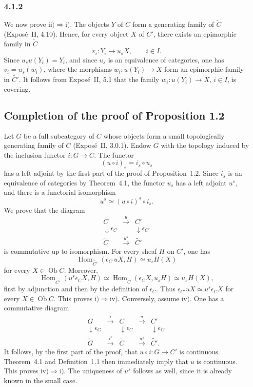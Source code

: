\documentclass[11pt]{article}
\newcommand{\Hom}{\operatorname{Hom}}
\newcommand{\Ob}{\operatorname{Ob}}
\begin{document}
\subsubsection*{4.1.2}
We now prove \(\mathrm{ii})\Rightarrow\mathrm{i})\). The objects \(Y\) of \(C\) form a generating family of \(\widetilde C\) (Expos\'e~II, 4.10). Hence, for every object \(X\) of \(C'\), there exists an epimorphic family in \(\widetilde C\)
\[
v_i:Y_i\longrightarrow u_sX,
\qquad i\in I.
\]
Since \(u_su(Y_i)=Y_i\), and since \(u_s\) is an equivalence of categories, one has \(v_i=u_s(w_i)\), where the morphisms \(w_i:u(Y_i)\to X\) form an epimorphic family in \(\widetilde{C'}\). It follows from Expos\'e~II, 5.1 that the family \(w_i:u(Y_i)\to X\), \(i\in I\), is covering.

\subsection{Completion of the proof of Proposition 1.2}
Let \(G\) be a full subcategory of \(C\) whose objects form a small topologically generating family of \(C\) (Expos\'e~II, 3.0.1). Endow \(G\) with the topology induced by the inclusion functor \(i:G\to C\). The functor
\[
(u\circ i)_s=i_s\circ u_s
\]
has a left adjoint by the first part of the proof of Proposition~1.2. Since \(i_s\) is an equivalence of categories by Theorem~4.1, the functor \(u_s\) has a left adjoint \(u^s\), and there is a functorial isomorphism
\[
u^s\simeq (u\circ i)^s\circ i_s.
\]
We prove that the diagram
\[
\begin{array}{ccc}
C&\xrightarrow{u}&C'\\
\downarrow\epsilon_C&&\downarrow\epsilon_{C'}\\
\widetilde C&\xrightarrow{u^s}&\widetilde{C'}
\end{array}
\tag{4.2.1}
\]
is commutative up to isomorphism. For every sheaf \(H\) on \(C'\), one has
\[
\Hom_{\widetilde{C'}}(\epsilon_{C'}uX,H)\simeq u_sH(X)
\]
for every \(X\in\Ob C\). Moreover,
\[
\Hom_{\widetilde{C'}}(u^s\epsilon_CX,H)
\simeq \Hom_{\widetilde C}(\epsilon_CX,u_sH)
\simeq u_sH(X),
\]
first by adjunction and then by the definition of \(\epsilon_C\). Thus \(\epsilon_{C'}uX\simeq u^s\epsilon_CX\) for every \(X\in\Ob C\). This proves \(\mathrm{i})\Rightarrow\mathrm{iv})\). Conversely, assume \(\mathrm{iv})\). One has a commutative diagram
\[
\begin{array}{ccccc}
G&\xrightarrow{i}&C&\xrightarrow{u}&C'\\
\downarrow\epsilon_G&&\downarrow\epsilon_C&&\downarrow\epsilon_{C'}\\
\widetilde G&\xrightarrow{i^s}&\widetilde C&\xrightarrow{u^s}&\widetilde{C'}.
\end{array}
\tag{4.2.2}
\]
It follows, by the first part of the proof, that \(u\circ i:G\to C'\) is continuous. Theorem~4.1 and Definition~1.1 then immediately imply that \(u\) is continuous. This proves \(\mathrm{iv})\Rightarrow\mathrm{i})\). The uniqueness of \(u^s\) follows as well, since it is already known in the small case.
\end{document}
